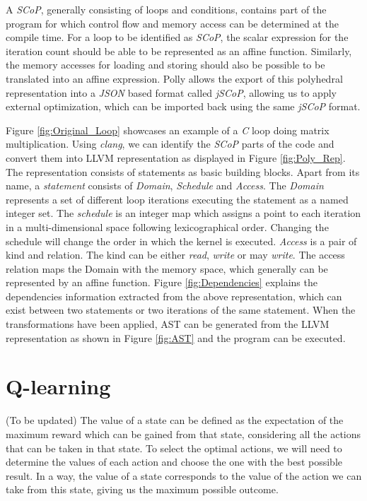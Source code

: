 \documentclass[logo,msc]{infthesis}           %
\begin{document}
A \textit{SCoP}, generally consisting of loops and conditions, contains part of the program for which control flow and memory access can be determined at the compile time. For a loop to be identified as \textit{SCoP}, the scalar expression for the iteration count should be able to be represented as an affine function. Similarly, the memory accesses for loading and storing should also be possible to be translated into an affine expression. Polly allows the export of this polyhedral representation into a \textit{JSON} based format called \textit{jSCoP},
allowing us to apply external optimization, which can be imported back using the same \textit{jSCoP} format.

 Figure \ref{fig:Original_Loop} showcases an example of a \textit{C} loop doing matrix multiplication. Using \textit{clang}, we can identify the \textit{SCoP} parts of the code and convert them into LLVM representation as displayed in Figure \ref{fig:Poly_Rep}. The representation consists of statements as basic building blocks. Apart from its name, a \textit{statement} consists of \textit{Domain}, \textit{Schedule} and \textit{Access}. The \textit{Domain} represents a set of different loop iterations executing the statement as a named integer set. The \textit{schedule} is an integer map which assigns a point to each iteration in a multi-dimensional space following lexicographical order. Changing the schedule will change the order in which the kernel is executed. \textit{Access} is a pair of kind and relation. The kind can be either \textit{read}, \textit{write} or may \textit{write}. The access relation maps the Domain with the memory space, which generally can be represented by an affine function. Figure \ref{fig:Dependencies} explains the dependencies information extracted from the above representation, which can exist between two statements or two iterations of the same statement. When the transformations have been applied, AST can be generated from the LLVM representation as shown in Figure \ref{fig:AST} and the program can be executed\cite{10.1145/2743016}.

 \section{Q-learning}

 (To be updated) The value of a state can be defined as the expectation of the maximum reward which can be gained from that state, considering all the actions that can be taken in that state. To select the optimal actions, we will need to determine the values of each action and choose the one with the best possible result. In a way, the value of a state corresponds to the value of the action we can take from this state, giving us the maximum possible outcome.
\end{document}
